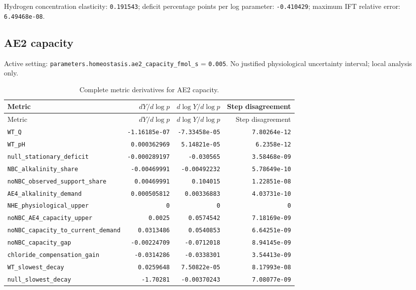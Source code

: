 Hydrogen concentration elasticity: \texttt{0.191543}; deficit percentage points per log parameter: \texttt{-0.410429}; maximum IFT relative error: \texttt{6.49468e-08}.\par

\subsection*{AE2 capacity}
Active setting: \nolinkurl{parameters.homeostasis.ae2_capacity_fmol_s} = \texttt{0.005}. No justified physiological uncertainty interval; local analysis only.


\begingroup\scriptsize
\setlength{\tabcolsep}{3pt}
\begin{longtable}{p{.44\linewidth}rrr}
\caption{Complete metric derivatives for AE2 capacity.}\\
\toprule
Metric & $dY/d\log p$ & $d\log Y/d\log p$ & Step disagreement \\
\midrule\endfirsthead
\toprule
Metric & $dY/d\log p$ & $d\log Y/d\log p$ & Step disagreement \\
\midrule\endhead
\bottomrule\endfoot
\nolinkurl{WT_Q} & \texttt{-1.16185e-07} & \texttt{-7.33458e-05} & \texttt{7.80264e-12} \\
\nolinkurl{WT_pH} & \texttt{0.000362969} & \texttt{5.14821e-05} & \texttt{6.2358e-12} \\
\nolinkurl{null_stationary_deficit} & \texttt{-0.000289197} & \texttt{-0.030565} & \texttt{3.58468e-09} \\
\nolinkurl{NBC_alkalinity_share} & \texttt{-0.00469991} & \texttt{-0.00492232} & \texttt{5.78649e-10} \\
\nolinkurl{noNBC_observed_support_share} & \texttt{0.00469991} & \texttt{0.104015} & \texttt{1.22851e-08} \\
\nolinkurl{AE4_alkalinity_demand} & \texttt{0.000505812} & \texttt{0.00336883} & \texttt{4.03731e-10} \\
\nolinkurl{NHE_physiological_upper} & \texttt{0} & \texttt{0} & \texttt{0} \\
\nolinkurl{noNBC_AE4_capacity_upper} & \texttt{0.0025} & \texttt{0.0574542} & \texttt{7.18169e-09} \\
\nolinkurl{noNBC_capacity_to_current_demand} & \texttt{0.0313486} & \texttt{0.0540853} & \texttt{6.64251e-09} \\
\nolinkurl{noNBC_capacity_gap} & \texttt{-0.00224709} & \texttt{-0.0712018} & \texttt{8.94145e-09} \\
\nolinkurl{chloride_compensation_gain} & \texttt{-0.0314286} & \texttt{-0.0338301} & \texttt{3.54413e-09} \\
\nolinkurl{WT_slowest_decay} & \texttt{0.0259648} & \texttt{7.50822e-05} & \texttt{8.17993e-08} \\
\nolinkurl{null_slowest_decay} & \texttt{-1.70281} & \texttt{-0.00370243} & \texttt{7.08077e-09} \\
\end{longtable}
\endgroup

